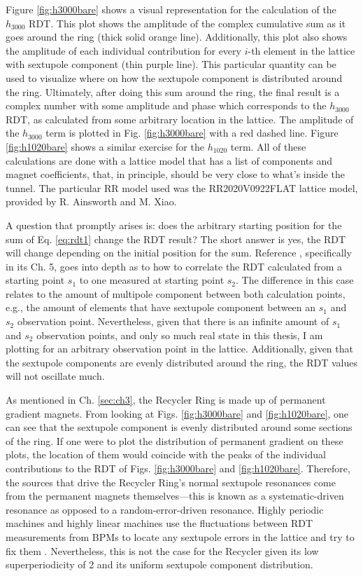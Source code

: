 Figure \ref{fig:h3000bare} shows a visual representation for the calculation of the $h_{3000}$ RDT. This plot shows the amplitude of the complex cumulative sum as it goes around the ring (thick solid orange line). Additionally, this plot also shows the amplitude of each individual contribution for every $i$-th element in the lattice with sextupole component (thin purple line). This particular quantity can be used to visualize where on how the sextupole component is distributed around the ring. Ultimately, after doing this sum around the ring, the final result is a complex number with some amplitude and phase which corresponds to the $h_{3000}$ RDT, as calculated from some arbitrary location in the lattice. The amplitude of the $h_{3000}$ term is plotted in Fig. \ref{fig:h3000bare} with a red dashed line. Figure \ref{fig:h1020bare} shows a similar exercise for the $h_{1020}$ term. All of these calculations are done with a lattice model that has a list of components and magnet coefficients, that, in principle, should be very close to what's inside the tunnel. The particular RR model used was the RR2020V0922FLAT lattice model, provided by R. Ainsworth and M. Xiao.

A question that promptly arises is: does the arbitrary starting position for the sum of Eq. \ref{eq:rdt1} change the RDT result? The short answer is yes, the RDT will change depending on the initial position for the sum. Reference \cite{cernthesis2}, specifically in its Ch. 5, goes into depth as to how to correlate the RDT calculated from a starting point $s_1$ to one measured at starting point $s_2$. The difference in this case relates to the amount of multipole component between both calculation points, e.g., the amount of elements that have sextupole component between an $s_1$ and $s_2$ observation point. Nevertheless, given that there is an infinite amount of $s_1$ and $s_2$ observation points, and only so much real state in this thesis, I am plotting for an arbitrary observation point in the lattice. Additionally, given that the sextupole components are evenly distributed around the ring, the RDT values will not oscillate much.

As mentioned in Ch. \ref{sec:ch3}, the Recycler Ring is made up of permanent gradient magnets. From looking at Figs. \ref{fig:h3000bare} and \ref{fig:h1020bare}, one can see that the sextupole component is evenly distributed around some sections of the ring. If one were to plot the distribution of permanent gradient on these plots, the location of them would coincide with the peaks of the individual contributions to the RDT of Figs. \ref{fig:h3000bare} and \ref{fig:h1020bare}. Therefore, the sources that drive the Recycler Ring's normal sextupole resonances come from the permanent magnets themselves---this is known as a systematic-driven resonance as opposed to a random-error-driven resonance. Highly periodic machines and highly linear machines use the fluctuations between RDT measurements from BPMs to locate any sextupole errors in the lattice and try to fix them \cite{cernthesis2}. Nevertheless, this is not the case for the Recycler given its low superperiodicity of 2 and its uniform sextupole component distribution.

